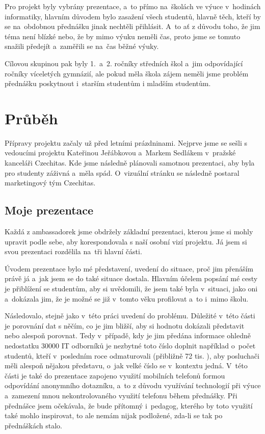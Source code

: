 \documentclass[12pt]{report}			%
\begin{document}
            Pro projekt byly vybrány prezentace, a~to přímo na~školách ve výuce v~hodinách informatiky, hlavním důvodem bylo zasažení všech studentů, hlavně těch, kteří by se na~obdobnou přednášku jinak nechtěli přihlásit. A~to ať z důvodu toho, že jim téma není blízké nebo, že by mimo výuku neměli čas, proto jsme se tomuto snažili předejít a~zaměřili se na~čas běžné výuky. 

            Cílovou skupinou pak byly 1.~a~2. ročníky středních škol a~jim odpovídající ročníky víceletých gymnázií, ale pokud měla škola zájem neměli jsme problém přednášku poskytnout i~starším studentům i mladším studentům.

        \section{Průběh}

            Přípravy projektu začaly už před letními prázdninami. Nejprve jsme se sešli s vedoucími projektu Kateřinou Jeřábkovou a~Markem Sedlákem v~pražské kanceláři Czechitas. Kde jsme následně plánovali samotnou prezentaci, aby byla pro studenty záživná a~měla spád. O~vizuální stránku se následně postaral marketingový tým Czechitas.

            \subsection{Moje prezentace}
                Každá z ambassadorek jsme obdržely základní prezentaci, kterou jsme si mohly upravit podle sebe, aby korespondovala s naší osobní vizí projektu. 
                Já jsem si svou prezentaci rozdělila na~tři hlavní části. 

                Úvodem prezentace bylo mé představení, uvedení do situace, proč jim přenáším právě já a~jak jsem se do také situace dostala. Hlavním účelem popsání mé cesty je přiblížení se studentům, aby si uvědomili, že jsem také byla v~situaci, jako oni a~dokázala jim, že je možné se již v~tomto věku profilovat a~to i~mimo školu.

                Následovalo, stejně jako v~této práci uvedení do problému. Důležité v~této části je porovnání dat s něčím, co je jim bližší, aby si hodnotu dokázali představit nebo alespoň porovnat. Tedy v~případě, kdy je jim předána informace ohledně nedostatku 30000 IT odborníků je nezbytné toto číslo doplnit například o~počet studentů, kteří v~posledním roce odmaturovali (přibližně 72 tis. \cite{PocetMaturantu}), aby posluchači měli alespoň nějakou představu, o~jak velké číslo se v~kontextu jedná. V~této části je také do prezentace zapojeno využití mobilních telefonů formou odpovídání anonymního dotazníku, a~to z důvodu využívání technologií při výuce a~zamezení mnou nekontrolovaného využití telefonu během přednášky. Při přednášce jsem očekávala, že bude přítomný i~pedagog, kterého by toto využití také mohlo inspirovat, to ale nemám nijak podložené, zda-li se tak po přednáškách stalo.
\end{document}
